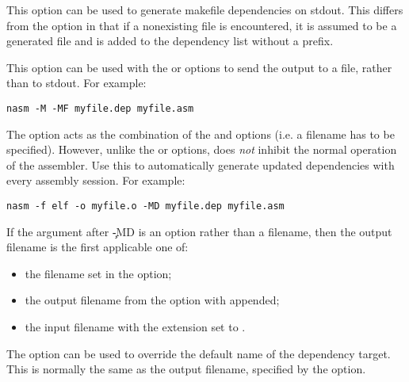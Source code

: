 
This option can be used to generate makefile dependencies on stdout.
This differs from the  option in that if a nonexisting file is
encountered, it is assumed to be a generated file and is added to the
dependency list without a prefix.


This option can be used with the  or  options
to send the output to a file, rather than to stdout. For example:

\begin{lstlisting}
nasm -M -MF myfile.dep myfile.asm
\end{lstlisting}


The  option acts as the combination of the 
and  options (i.e. a filename has to be specified).
However, unlike the  or  options, 
does \emph{not} inhibit the normal operation of the assembler.
Use this to automatically generate updated dependencies with
every assembly session. For example:

\begin{lstlisting}
nasm -f elf -o myfile.o -MD myfile.dep myfile.asm
\end{lstlisting}

If the argument after \c{-MD} is an option rather than a filename,
then the output filename is the first applicable one of:

\begin{itemize}
    \item{the filename set in the  option;}
    \item{the output filename from the  option with  appended;}
    \item{the input filename with the extension set to .}
\end{itemize}


The  option can be used to override the default name of the
dependency target. This is normally the same as the output filename,
specified by the  option.

